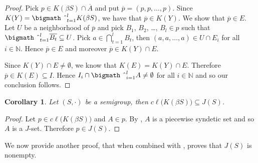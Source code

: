 \documentclass[12pt]{article}
\theoremstyle{plain}
\newtheorem{cor}[thm]{Corollary}
\theoremstyle{definition}
\newcommand{\bbN}{\mathbb{N}}
\newcommand{\bigtimes}{\hbox{\bigmath \char'2}}
\begin{document}
\begin{proof}
  Pick $p \in K(\beta S) \cap \overline{A}$ and put $\overline{p} = (p, p, \ldots, p)$. 
  Since $K(Y) = \bigtimes_{t=1}^l K(\beta S)$, we have that $\overline{p} \in K(Y)$. 
  We show that $\overline{p} \in E$.
  Let $U$ be a neighborhood of $\overline{p}$ and pick $B_1$, $B_2$, \dots, $B_l \in p$ such that $\bigtimes_{t=1}^l \overline{B_t} \subseteq U$. 
  Pick $a \in \bigcap_{t=1}^l B_t$, then $(a, a, \ldots, a) \in U \cap E_i$ for all $i \in \bbN$. 
  Hence $\overline{p} \in E$ and moreover $\overline{p} \in K(Y) \cap E$.

  Since $K(Y) \cap E \ne \emptyset$, we know that $K(E) = K(Y) \cap E$.
  Therefore $\overline{p} \in K(E) \subseteq I$.
  Hence $I_i \cap \bigtimes_{i=1}^l A \ne \emptyset$ for all $i \in \bbN$ and so our conclusion follows.
\end{proof}

\begin{cor}
  Let $(S, \cdot)$ be a semigroup, then $c\ell\bigl( K(\beta S) \bigr) \subseteq J(S)$.
\end{cor}
\begin{proof}
  Let $p \in c\ell\bigl( K(\beta S) \bigr)$ and $A \in p$.
  By \cite[Corollary 4.41]{Hindman:1998fk}, $A$ is a piecewise syndetic set and so $A$ is a $J$-set.
  Therefore $p \in J(S)$.
\end{proof}

We now provide another proof, that when combined with \cite[Theorem 3.11]{Hindman:1998fk}, proves that $J(S)$ is nonempty.
\end{document}
